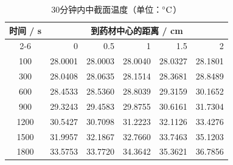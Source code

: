 \begin{table}[H]
\centering\small
\caption{30分钟内中截面温度（单位：$\celsius$）}\label{tab:temperature}
\begin{tabular}{crrrrr}
\toprule
\multirow{2}{*}{时间 / s} & \multicolumn{5}{c}{到药材中心的距离 / cm}\\
\cmidrule(lr){2-6} & 0 & 0.5 & 1 & 1.5 & 2\\
\midrule
100 & 28.0001 & 28.0003 & 28.0040 & 28.0327 & 28.1801 \\
300 & 28.0408 & 28.0635 & 28.1514 & 28.3681 & 28.8489 \\
600 & 28.4533 & 28.5360 & 28.8039 & 29.3159 & 30.1652 \\
900 & 29.3243 & 29.4583 & 29.8755 & 30.6161 & 31.7304 \\
1200 & 30.5427 & 30.7098 & 31.2223 & 32.1126 & 33.4276 \\
1500 & 31.9957 & 32.1867 & 32.7660 & 33.7463 & 35.1203 \\
1800 & 33.5753 & 33.7720 & 34.3642 & 35.3621 & 36.7856 \\
\bottomrule
\end{tabular}
\end{table}

